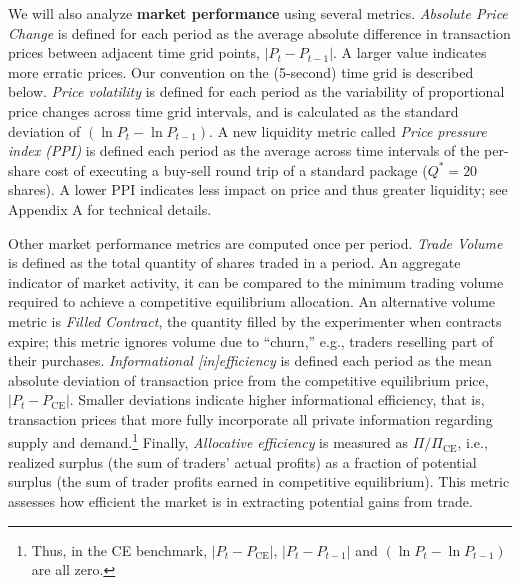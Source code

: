 \documentclass[12pt]{article}
\begin{document}
We will also analyze \textbf{market performance} using several metrics.
\textit{Absolute Price Change} is defined for each period as the average absolute difference in transaction prices between adjacent time grid points, $|P_t - P_{t-1}|$. A larger value indicates more erratic prices. 
Our convention on
the (5-second) time grid is described below. %
\textit{Price volatility} is defined for each period as the variability of proportional price changes across time grid intervals, and is calculated as the standard deviation of $(\ln P_t - \ln P_{t-1})$.
A new liquidity metric called 
\textit{Price pressure index (PPI)} is defined each period as the average across time intervals of the per-share cost of executing a buy-sell round trip of a standard package ($Q^* = 20$ shares). %
A lower PPI indicates less impact on price and thus greater liquidity; see Appendix A for technical details.  

Other market performance metrics are computed once per period.
\textit{Trade Volume} is defined  as the total quantity of shares traded in a period. An aggregate indicator of market activity, it can be compared to the minimum trading volume required to achieve a competitive equilibrium allocation. An alternative volume metric is \textit{Filled Contract}, the quantity filled by the experimenter when contracts expire; this metric ignores volume due to ``churn,'' e.g.,  traders reselling part of their purchases.
\textit{Informational [in]efficiency} is  defined each period as the mean absolute deviation of transaction price from the  competitive equilibrium price, \( |P_t - P_{\text{CE}}| \). 
Smaller deviations indicate higher informational efficiency, that is, transaction prices that more fully incorporate all private information regarding supply and demand.\footnote{
Thus, in the CE benchmark, \( |P_t - P_{\text{CE}}| \), $|P_t - P_{t-1}|$ and 
$(\ln P_t - \ln P_{t-1})$ are all zero.}
Finally, \textit{Allocative efficiency} is measured as \( \Pi/\Pi_{\text{CE}}\), i.e.,
 realized surplus (the sum of traders' actual profits) as a fraction of potential surplus (the sum of trader profits earned in competitive equilibrium). 
This metric assesses how efficient the market is in extracting potential gains from trade.       


\end{document}
